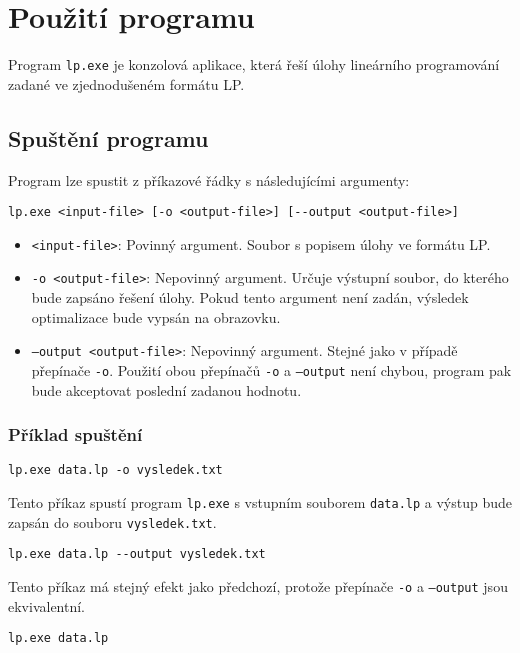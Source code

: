 \documentclass[czech, sem, kiv, he, pdf, viewonly]{fasthesis}
\begin{document}
\section{Použití programu}
Program \texttt{lp.exe} je konzolová aplikace, která řeší úlohy lineárního programování zadané ve zjednodušeném formátu LP.

\subsection{Spuštění programu}
Program lze spustit z příkazové řádky s následujícími argumenty:
\begin{verbatim}
lp.exe <input-file> [-o <output-file>] [--output <output-file>]
\end{verbatim}

\begin{itemize}
    \item \texttt{<input-file>}: Povinný argument. Soubor s popisem úlohy ve formátu LP.
    \item \texttt{-o <output-file>}: Nepovinný argument. Určuje výstupní soubor, do kterého bude zapsáno řešení úlohy. Pokud tento argument není zadán, výsledek optimalizace bude vypsán na obrazovku.
    \item \texttt{--output <output-file>}: Nepovinný argument. Stejné jako v případě přepínače \texttt{-o}. Použití obou přepínačů \texttt{-o} a \texttt{--output} není chybou, program pak bude akceptovat poslední zadanou hodnotu.
\end{itemize}

\subsubsection*{Příklad spuštění}
\begin{verbatim}
lp.exe data.lp -o vysledek.txt
\end{verbatim}

Tento příkaz spustí program \texttt{lp.exe} s vstupním souborem \texttt{data.lp} a výstup bude zapsán do souboru \texttt{vysledek.txt}.

\begin{verbatim}
lp.exe data.lp --output vysledek.txt
\end{verbatim}

Tento příkaz má stejný efekt jako předchozí, protože přepínače \texttt{-o} a \texttt{--output} jsou ekvivalentní.

\begin{verbatim}
lp.exe data.lp
\end{verbatim}
\end{document}
